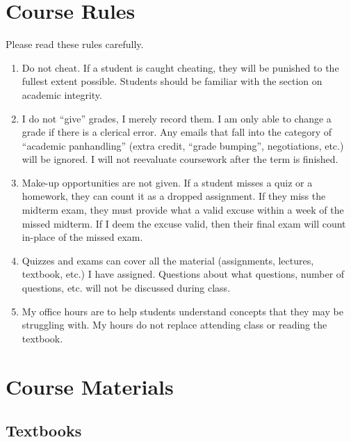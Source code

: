 \documentclass[11pt]{paper}
\begin{document}
\newpage

\tableofcontents

\newpage

\section{Course Rules}

Please read these rules carefully.

\begin{enumerate}

\item Do not cheat. If a student is caught cheating, they will be punished to the fullest extent possible. Students should be familiar with the section on academic integrity.

\item I do not ``give'' grades, I merely record them. I am only able to change a grade if there is a clerical error. Any emails that fall into the category of ``academic panhandling'' (extra credit, ``grade bumping'', negotiations, etc.) will be ignored. I will not reevaluate coursework after the term is finished.

\item Make-up opportunities are not given. If a student misses a quiz or a homework, they can count it as a dropped assignment. If they miss the midterm exam, they must provide what a valid excuse within a week of the missed midterm. If I deem the excuse valid, then their final exam will count in-place of the missed exam. 

\item Quizzes and exams can cover all the material (assignments, lectures, textbook, etc.) I have assigned. Questions about what questions, number of questions, etc. will not be discussed during class.

\item My office hours are to help students understand concepts that they may be struggling with. My hours do not replace attending class or reading the textbook.



\end{enumerate}


\section{Course Materials}
 
\subsection{Textbooks}
\end{document}
